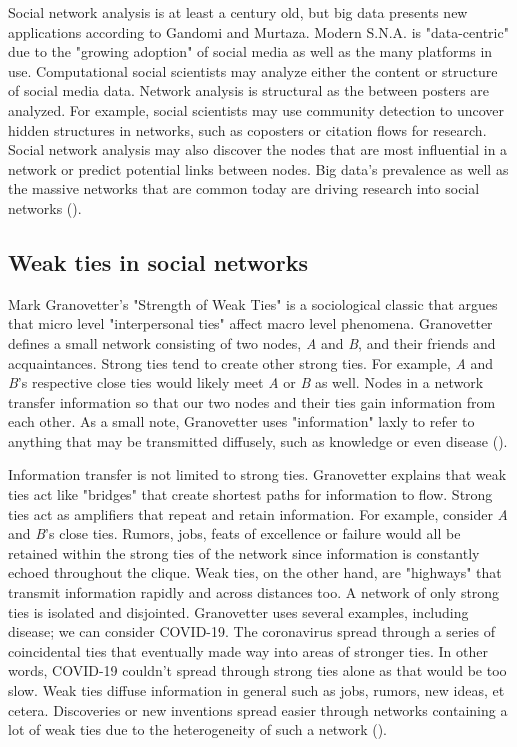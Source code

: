 \documentclass[12pt, a4paper]{article}
\begin{document}
Social network analysis is at least a century old, but big data presents new applications according to Gandomi and Murtaza. Modern S.N.A. is "data-centric" due to the "growing adoption" of social media as well as the many platforms in use. Computational social scientists may analyze either the content or structure of social media data. Network analysis is structural as the  between posters are analyzed. For example, social scientists may use community detection to uncover hidden structures in networks, such as coposters or citation flows for research. Social network analysis may also discover the nodes that are most influential in a network or predict potential links between nodes. Big data's prevalence as well as the massive networks that are common today are driving research into social networks (\cite{gandomiamir2015}).

\subsection{Weak ties in social networks}
Mark Granovetter's "Strength of Weak Ties" is a sociological classic that argues that micro level "interpersonal ties" affect macro level phenomena. Granovetter defines a small network consisting of two nodes, \textit{A} and \textit{B}, and their friends and acquaintances. Strong ties tend to create other strong ties. For example, \textit{A} and \textit{B}'s respective close ties would likely meet \textit{A} or \textit{B} as well. Nodes in a network transfer information so that our two nodes and their ties gain information from each other. As a small note, Granovetter uses "information" laxly to refer to anything that may be transmitted diffusely, such as knowledge or even disease (\cite{granovetter1973}).

Information transfer is not limited to strong ties. Granovetter explains that weak ties act like "bridges" that create shortest paths for information to flow. Strong ties act as amplifiers that repeat and retain information. For example, consider \textit{A} and \textit{B}'s close ties. Rumors, jobs, feats of excellence or failure would all be retained within the strong ties of the network since information is constantly echoed throughout the clique. Weak ties, on the other hand, are "highways" that transmit information rapidly and across distances too. A network of only strong ties is isolated and disjointed. Granovetter uses several examples, including disease; we can consider COVID-19. The coronavirus spread through a series of coincidental ties that eventually made way into areas of stronger ties. In other words, COVID-19 couldn't spread through strong ties alone as that would be too slow. Weak ties diffuse information in general such as jobs, rumors, new ideas, et cetera. Discoveries or new inventions spread easier through networks containing a lot of weak ties due to the heterogeneity of such a network (\cite{granovetter1973}).
\end{document}
